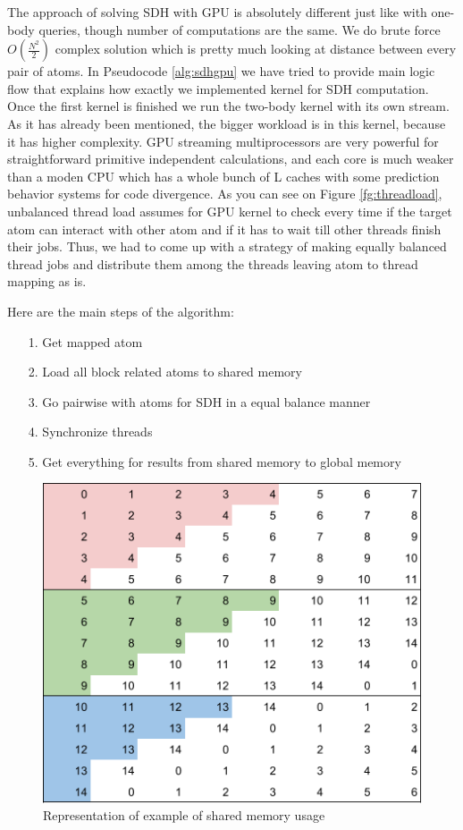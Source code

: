 \documentclass[12pt,letterpaper]{report}
\begin{document}
\hspace{3em} The approach of solving SDH with GPU is absolutely different just like with one-body queries, though number of computations are the same. We do brute force  $O(\frac{N^2}{2})$ complex solution which is pretty much looking at distance between every pair of atoms. In Pseudocode \ref{alg:sdhgpu} we have tried to provide main logic flow that explains how exactly we implemented kernel for SDH computation. 
Once the first kernel is finished we run the two-body kernel with its own stream. As it has already been mentioned, the bigger workload is in this kernel, because it has higher complexity. GPU streaming multiprocessors are very powerful for straightforward primitive independent calculations, and each core is much weaker than a moden CPU which has a whole bunch of L caches with some prediction behavior systems for code divergence. As you can see on Figure \ref{fg:threadload}, unbalanced thread load assumes for GPU kernel to check every time if the target atom can interact with other atom and if it has to wait till other threads finish their jobs. Thus, we had to come up with a strategy of making equally balanced thread jobs and distribute them among the threads leaving atom to thread mapping as is. 

Here are the main steps of the algorithm:
\begin{itemize}
\item[1.] Get mapped atom
\item[2.] Load all block related atoms to shared memory
\item[3.] Go pairwise with atoms for SDH in a equal balance manner
\item[4.] Synchronize threads
\item[5.] Get everything for results from shared memory to global memory
\end{itemize}


\begin{figure}
 \centerline{ \includegraphics[width=0.5\columnwidth]{images/sharedMem}}
 \caption{Representation of example of shared memory usage}
 \label{fg:sharedMem}
\end{figure}
\end{document}
